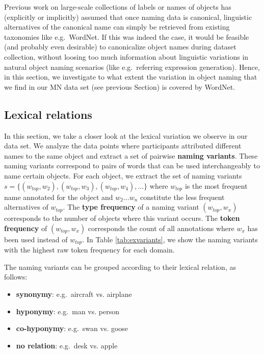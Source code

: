 
Previous work on large-scale collections of labels or names of objects has (explicitly or implicitly) assumed that once naming data is canonical, linguistic alternatives of the canonical name can simply be retrieved from existing taxonomies like e.g.\ WordNet. 
If this was indeed the case, it would be feasible (and probably even desirable) to canonicalize object names during dataset collection, without loosing too much information about linguistic variations in natural object naming scenarios (like e.g.\ referring expression generation).
Hence, in this section, we investigate to what extent the variation in object naming that we find in our MN data set (see previous Section) is covered by WordNet.

\subsection{Lexical relations}

In this section, we take a closer look at the lexical variation we observe in our data set. We analyze the data points where participants attributed different names to the same object and extract a set of  pairwise \textbf{naming variants}. These naming variants correspond to pairs of words that can be used interchangeably to name certain objects.
For each object, we extract the set of naming variants $s = \{ (w_{top},w_2), (w_{top},w_3), (w_{top},w_4),... \}$  where $w_{top}$ is the most frequent name annotated for the object and $w_2 ... w_n$ constitute the less frequent alternatives of $w_{top}$.  The  \textbf{type frequency} of a naming variant $(w_{top},w_x)$ corresponds to the number of objects where this variant occurs. The \textbf{token frequency} of $(w_{top},w_x)$ corresponds the count of all annotations where $w_x$ has been used instead of $w_{top}$.
In Table \ref{tab:exvariants}, we show the naming variants with the highest raw token frequency for each domain. 

The naming variants can be grouped according to their lexical relation, as follows:

\begin{itemize}
\item \textbf{synonymy}: e.g.\ aircraft vs. airplane 
\item \textbf{hyponymy}: e.g.\ man vs. person
\item \textbf{co-hyponymy}: e.g.\ swan vs. goose
\item \textbf{no relation}: e.g.\  desk vs. apple
\end{itemize}

